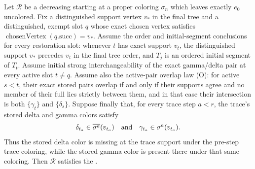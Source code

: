 \begin{helper}
Let \(\mathcal R\) be a decreasing
 starting at a proper coloring
\(\sigma_n\) which leaves exactly \(e_0\) uncolored. Fix a distinguished
support vertex \(v_*\) in the final tree and a distinguished, exempt slot
\(q\) whose exact chosen vertex satisfies
\(\operatorname{chosenVertex}(q.\mathrm{succ})=v_*\). Assume the order
and initial-segment conclusions for every restoration slot: whenever \(t\)
has exact support \(v_t\), the distinguished support \(v_*\) precedes
\(v_t\) in the final tree order, and \(T_j\) is an ordered initial segment
of \(T_t\). Assume initial strong interchangeability of the exact
gamma/delta pair at every active slot \(t\ne q\). Assume also the
active-pair overlap law (O): for active \(s<t\), their exact stored pairs
overlap if and only if their supports agree and no member of their full
 lies strictly between them, and in that
case their intersection is both \(\{\gamma_t\}\) and
\(\{\delta_s\}\). Suppose finally that, for every trace step \(a<r\),
the trace's stored delta and gamma colors satisfy
\[
 \delta_{t_a}\in\overline{\sigma^a}(v_{t_a})
 \quad\hbox{and}\quad
 \gamma_{t_a}\in\sigma^a(v_{t_a}).
\]
Thus the stored delta color is missing at the trace support under the
pre-step trace coloring, while the stored gamma color is present there
under that same coloring.
Then \(\mathcal R\) satisfies the
.
\end{helper}
